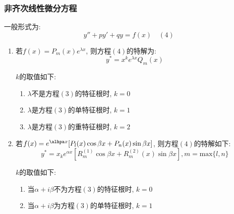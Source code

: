 \subsubsection{非齐次线性微分方程}
一般形式为:
\begin{equation*}
y''+py'+qy=f(x) \quad (4)
\end{equation*}
\begin{enumerate}
\item 若$ f(x)=P_{m}(x)e^{\lambda x} $, 则方程$ (4) $的特解为:
\begin{equation*}
y^{*}=x^{k}e^{\lambda x}Q_{m}(x)
\end{equation*}\par $ k $的取值如下:
\begin{enumerate}
\item $ \lambda $不是方程$ (3) $的特征根时, $ k=0 $
\item $ \lambda $是方程$ (3) $的单特征根时, $ k=1 $
\item $ \lambda $是方程$ (3) $的重特征根时, $ k=2 $
\end{enumerate}
\item 若$ f(x)=e^{\alhpa x}[P_{l}(x)\cos \beta x+P_{n}(x)\sin \beta x] $, 则方程$ (4) $的特解如下:
\begin{equation*}
y^{*}=x_{k}e^{\alpha x}[R_{m}^{(1)}\cos \beta x+R_{m}^{(2)}(x)\sin \beta x], m=\mathrm{max}\{l,n\}
\end{equation*}\par $ k $的取值如下:
\begin{enumerate}
\item 当$ \alpha+i\beta $不为方程$ (3) $的特征根时, $ k=0 $
\item 当$ \alpha+i\beta $为方程$ (3) $的单特征根时, $ k=1 $
\end{enumerate}
\end{enumerate}


















